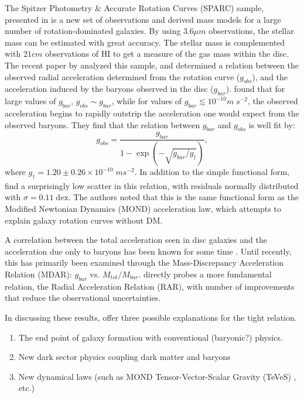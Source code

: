 The Spitzer Photometry \& Accurate Rotation Curves (SPARC) sample, presented in
\citet{Lelli2016b} is a new set of observations and derived mass models for a
large number of rotation-dominated galaxies.  By using $3.6\mu m$ observations,
the stellar mass can be estimated with great accuracy.  The stellar mass is
complemented with $21 cm$ observations of {\sc HI} to get a measure of the gas
mass within the disc. The recent paper by \citet{McGaugh2016} analyzed this
sample, and determined a relation between the observed
radial acceleration determined from the rotation curve ($g_{obs}$), and the
acceleration induced by the baryons observed in the disc ($g_{bar}$).
\citet{McGaugh2016} found that for large values of $g_{bar}$, $g_{obs}\sim
g_{bar}$, while for values of $g_{bar} \lesssim 10^{-10} m\;s^{-2}$, the
observed acceleration begins to rapidly outstrip the acceleration one would
expect from the observed baryons.  They find that the relation between $g_{bar}$
and $g_{obs}$ is well fit by:
\begin{equation} \label{g_fit}
    g_{obs} = \frac{g_{bar}}{1-\exp{(-\sqrt{g_{bar}/g_\dagger})}},
\end{equation}
where $g_\dagger=1.20\pm 0.26\times10^{-10}\;ms^{-2}$.  In addition to the
simple functional form, \citet{McGaugh2016} find a surprisingly low scatter in
this relation, with residuals normally distributed with $\sigma =
0.11\;\mathrm{dex}$.  The authors noted that this is the same functional form as
the Modified Newtonian Dynamics (MOND) \citep{Milgrom1983} acceleration law,
which attempts to explain galaxy rotation curves without DM.

A correlation between the total acceleration  seen in disc galaxies and the
acceleration due only to baryons has been known for some time
\citet{Sancisi2004,McGaugh2004}.  Until recently, this has primarily been
examined through the Mass-Discrepancy Acceleration Relation (MDAR): $g_{bar}$
vs. $M_{tot}/M_{bar}$.  \citet{McGaugh2016} directly probes a more fundamental
relation, the Radial Acceleration Relation (RAR), with number of
improvements that reduce the observational uncertainties.

In discussing these results, \citet{McGaugh2016} offer three possible
explanations for the tight relation. 
\begin{enumerate}
    \item The end point of galaxy formation with conventional (baryonic?)
        physics.
    \item New dark sector physics coupling dark matter and baryons
    \item New dynamical laws (such as MOND
        Tensor-Vector-Scalar Gravity (TeVeS)
        \citep{Bekenstein2004}, etc.)
\end{enumerate}


